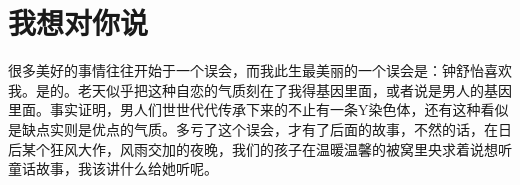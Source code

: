 \documentclass[cn,11pt,chinese]{elegantbook}
\begin{document}
%
%
%
%
%
%
%

%
%

\chapter{我想对你说}

很多美好的事情往往开始于一个误会，而我此生最美丽的一个误会是：钟舒怡喜欢我。是的。老天似乎把这种自恋的气质刻在了我得基因里面，或者说是男人的基因里面。事实证明，男人们世世代代传承下来的不止有一条Y染色体，还有这种看似是缺点实则是优点的气质。多亏了这个误会，才有了后面的故事，不然的话，在日后某个狂风大作，风雨交加的夜晚，我们的孩子在温暖温馨的被窝里央求着说想听童话故事，我该讲什么给她听呢。
\end{document}
